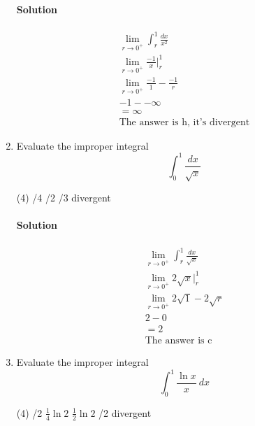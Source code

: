 \documentclass[MATH-115-Notes.tex]{subfiles}
\begin{document}
\begin{enumerate}[itemsep=5mm]
    \paragraph*{Solution} 
    \begin{gather*}
        \lim_{r \to 0^+} \int_{r}^{1}\frac{dx}{x^2}\\
        \lim_{r \to 0^+} \frac{-1}{x}\Big|_r^1\\
        \lim_{r \to 0^+} \frac{-1}{1}-\frac{-1}{r}\\
        -1 - -\infty\\
        = \infty\\
        \text{The answer is h, it's divergent}
    \end{gather*} 
    
    \item Evaluate the improper integral \[\int_{0}^{1}\frac{dx}{\sqrt{x}}\]
    \begin{tasks}(4)
        /4  
        /2
        /3
        \task divergent
    \end{tasks}
    \paragraph*{Solution}
    \begin{gather*}
        \lim_{r \to 0^+}\int_{r}^{1}\frac{dx}{\sqrt{x}}\\
        \lim_{r \to 0^+} 2\sqrt{x}\Big|_r^1\\
        \lim_{r \to 0^+} 2\sqrt{1} - 2\sqrt{r}\\
        2 - 0 \\ 
        = 2\\
        \text{The answer is c}
    \end{gather*}
    
    \item Evaluate the improper integral \[\int_{0}^{1}\frac{\ln x}{x}\ dx\]
    \begin{tasks}(4)
        /2   
        \task \(\frac{1}{4}\ln 2\)
        \task \(\frac{1}{2}\ln 2\)
        /2
        \task divergent
    \end{tasks}

\end{enumerate}
\end{document}
